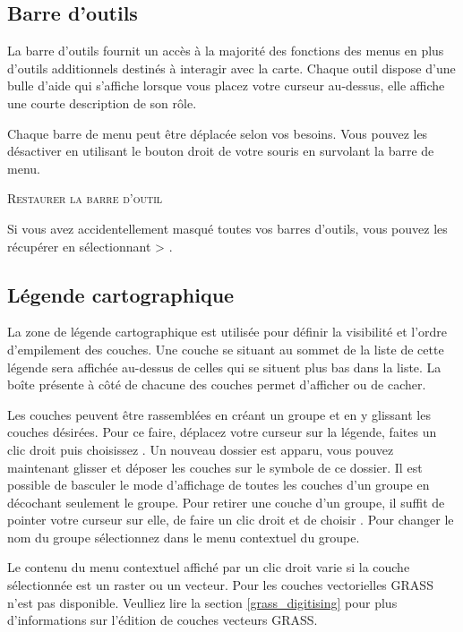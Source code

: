\subsection{Barre d'outils}\label{label_toolbars}

La barre d'outils fournit un accès à la majorité des fonctions des menus en plus d'outils additionnels destinés à interagir avec la carte. Chaque outil dispose d'une bulle d'aide qui s'affiche lorsque vous placez votre curseur au-dessus, elle affiche une courte description de son rôle.

Chaque barre de menu peut être déplacée selon vos besoins. Vous pouvez les désactiver en utilisant le bouton droit de votre souris en survolant la barre de menu.

\begin{Tip}
\caption{\textsc{Restaurer la barre d'outil}} 
Si vous avez accidentellement masqué toutes vos barres d'outils, vous pouvez les récupérer en sélectionnant  > .
\end{Tip}

\subsection{Légende cartographique}\label{label_legend}

La zone de légende cartographique est utilisée pour définir la visibilité et l'ordre d'empilement des couches. Une couche se situant au sommet de la liste de cette légende sera affichée au-dessus de celles qui se situent plus bas dans la liste. La boîte présente à côté de chacune des couches permet d'afficher ou de cacher.

Les couches peuvent être rassemblées en créant un groupe et en y glissant les couches désirées. Pour ce faire, déplacez votre curseur sur la légende, faites un clic droit puis choisissez . Un nouveau dossier est apparu, vous pouvez maintenant glisser et déposer les couches sur le symbole de ce dossier. Il est possible de basculer le mode d'affichage de toutes les couches d'un groupe en décochant seulement le groupe. Pour retirer une couche d'un groupe, il suffit de pointer votre curseur sur elle, de faire un clic droit et de choisir . Pour changer le nom du groupe sélectionnez  dans le menu contextuel du groupe.

Le contenu du menu contextuel affiché par un clic droit varie si la couche sélectionnée est un raster ou un vecteur. Pour les couches vectorielles GRASS  n'est pas disponible. Veulliez lire la section \ref{grass_digitising} pour plus d'informations sur l'édition de couches vecteurs GRASS.

